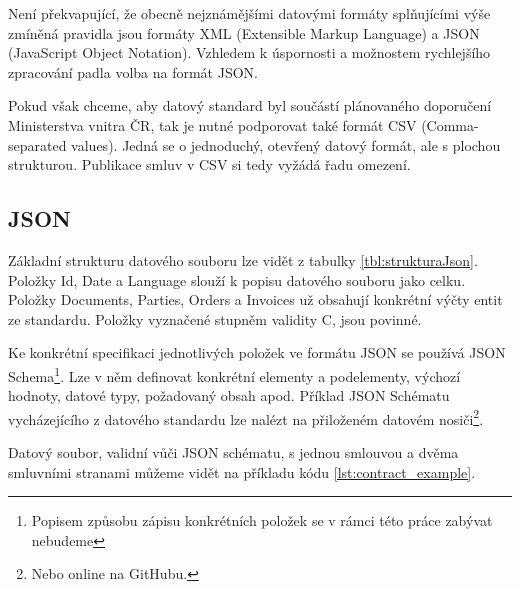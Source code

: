 Není překvapující, že obecně nejznámějšími datovými formáty splňujícími výše zmíněná pravidla jsou formáty XML (Extensible Markup Language) a JSON (JavaScript Object Notation)\cite{JSON}. Vzhledem k úspornosti a možnostem rychlejšího zpracování padla volba na formát JSON.

Pokud však chceme, aby datový standard byl součástí plánovaného doporučení Ministerstva vnitra ČR, tak je nutné podporovat také formát CSV (Comma-separated values)\cite{csv}. Jedná se o jednoduchý, otevřený datový formát, ale s plochou strukturou. Publikace smluv v CSV si tedy vyžádá řadu omezení. 

\subsection{JSON}

Základní strukturu datového souboru lze vidět z tabulky \ref{tbl:strukturaJson}. Položky Id, Date a Language slouží k popisu datového souboru jako celku. Položky Documents, Parties, Orders a Invoices už obsahují konkrétní výčty entit ze standardu. Položky vyznačené stupněm validity C, jsou povinné.

Ke konkrétní specifikaci jednotlivých položek ve formátu JSON se používá JSON Schema\cite{JSONSchema}\footnote{Popisem způsobu zápisu konkrétních položek se v rámci této práce zabývat nebudeme}. Lze v něm definovat konkrétní elementy a podelementy, výchozí hodnoty, datové typy, požadovaný obsah apod. Příklad JSON Schématu vycházejícího z datového standardu lze nalézt na přiloženém datovém nosiči\footnote{Nebo online na GitHubu\cite{contractschema}.}.

Datový soubor, validní vůči JSON schématu, s jednou smlouvou a dvěma smluvními stranami můžeme vidět na příkladu kódu \ref{lst:contract_example}.

\newpage

